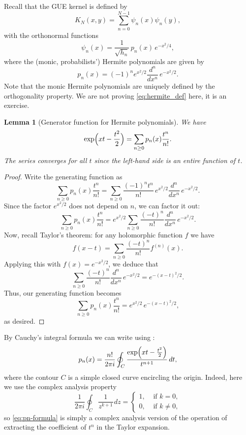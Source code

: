 \documentclass[letterpaper,11pt,oneside,reqno]{article}
\numberwithin{equation}{section}
\newcommand{\ssp}{\hspace{1pt}}
\newtheorem{lemma}[proposition]{Lemma}
\theoremstyle{definition}
\begin{document}
Recall that the GUE kernel is defined by
\[
K_N(x,y)=\sum_{n=0}^{N-1}\psi_n(x)\psi_n(y),
\]
with the orthonormal functions
\[
\psi_n(x)=\frac{1}{\sqrt{h_n}}\,p_n(x)\,e^{-x^2/4},
\]
where the (monic, probabilists') Hermite polynomials are given by
\begin{equation}
\label{eq:hermite_def}
	p_n(x)=(-1)^n e^{x^2/2}\frac{d^n}{dx^n}\,e^{-x^2/2}.
\end{equation}
Note that the monic Hermite polynomials are uniquely defined by the
orthogonality property. We are not proving \eqref{eq:hermite_def} here,
it is an exercise.
\begin{lemma}[Generator function for Hermite polynomials]
	\label{lem:hermite_gen}
	We have
	\[
		\exp\Bigl(xt-\frac{t^2}{2}\Bigr)=\sum_{n\ge0}p_n(x)\frac{t^n}{n!}.
	\]
	The series converges for all \(t\) since the left-hand side is an entire function of \(t\).
\end{lemma}
\begin{proof}
Write the generating function as
\[
	\sum_{n\ge0}p_n(x)\frac{t^n}{n!}
	=\sum_{n\ge0}\frac{(-1)^n t^n}{n!}\,e^{x^2/2}\frac{d^n}{dx^n}\,e^{-x^2/2}.
\]
Since the factor \(e^{x^2/2}\) does not depend on \(n\), we can factor it out:
\[
	\sum_{n\ge0}p_n(x)\frac{t^n}{n!}= e^{x^2/2}\sum_{n\ge0}\frac{(-t)^n}{n!}\frac{d^n}{dx^n}\,e^{-x^2/2}.
\]
Now, recall Taylor's theorem: for any holomorphic function \(f\) we have
\[
	f(x-t)=\sum_{n\ge0}\frac{(-t)^n}{n!}f^{(n)}(x).
\]
Applying this with \(f(x)=e^{-x^2/2}\), we deduce that
\[
	\sum_{n\ge0}\frac{(-t)^n}{n!}\frac{d^n}{dx^n}\,e^{-x^2/2}= e^{-(x-t)^2/2}.
\]
Thus, our generating function becomes
\[
	\sum_{n\ge0}p_n(x)\frac{t^n}{n!} = e^{x^2/2}\, e^{-(x-t)^2/2},
\]
as desired.
\end{proof}


By Cauchy's integral formula we can write using :
\begin{equation}
\label{eq:pn-formula}
p_n(x)=\frac{n!}{2\pi i}\oint_C\frac{\exp\Bigl(xt-\frac{t^2}{2}\Bigr)}{t^{n+1}}\,dt,
\end{equation}
where the contour \(C\) is a simple closed curve encircling the origin.
Indeed, here we use the complex analysis property
\begin{equation*}
	\frac{1}{2\pi i}\oint_C \frac{1}{z^{k+1}}\ssp dz=\begin{cases}
		1,&\text{ if }k=0,\\
		0,&\text{ if }k\neq0,
	\end{cases}
\end{equation*}
so \eqref{eq:pn-formula} is simply a complex analysis version of the
operation of extracting the coefficient of \(t^n\) in the Taylor expansion.
\end{document}
